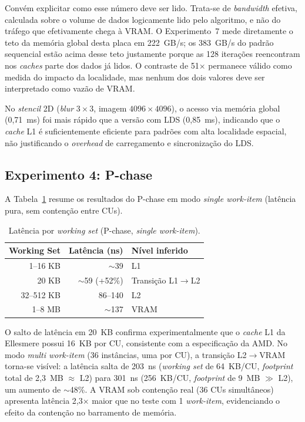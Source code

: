 Convém explicitar como esse número deve ser lido. Trata-se de \textit{bandwidth} efetiva, calculada sobre o volume de dados logicamente lido pelo algoritmo, e não do tráfego que efetivamente chega à VRAM. O Experimento~7 mede diretamente o teto da memória global desta placa em 222~GB/s; os 383~GB/s do padrão sequencial estão acima desse teto justamente porque as 128 iterações reencontram nos \textit{caches} parte dos dados já lidos. O contraste de 51$\times$ permanece válido como medida do impacto da localidade, mas nenhum dos dois valores deve ser interpretado como vazão de VRAM.

No \textit{stencil} 2D (\textit{blur} $3\times3$, imagem $4096\times4096$), o acesso via memória global (0,71~ms) foi mais rápido que a versão com LDS (0,85~ms), indicando que o \textit{cache} L1 é suficientemente eficiente para padrões com alta localidade espacial, não justificando o \textit{overhead} de carregamento e sincronização do LDS.


\subsection{Experimento 4: P-chase}

A Tabela~\ref{tab:pchase} resume os resultados do P-chase em modo \textit{single work-item} (latência pura, sem contenção entre CUs).

\begin{table}[ht]
\centering
\caption{Latência por \textit{working set} (P-chase, \textit{single work-item}).}
\label{tab:pchase}
\small
\begin{tabular}{@{}rrl@{}}
\toprule
\textbf{Working Set} & \textbf{Latência (ns)} & \textbf{Nível inferido} \\
\midrule
1--16 KB & $\sim$39 & L1 \\
20 KB & $\sim$59 (+52\%) & Transição L1$\to$L2 \\
32--512 KB & 86--140 & L2 \\
1--8 MB & $\sim$137 & VRAM \\
\bottomrule
\end{tabular}
\end{table}

O salto de latência em 20~KB confirma experimentalmente que o \textit{cache} L1 da Ellesmere possui 16~KB por CU, consistente com a especificação da AMD. No modo \textit{multi work-item} (36 instâncias, uma por CU), a transição L2$\to$VRAM torna-se visível: a latência salta de 203~ns (\textit{working set} de 64~KB/CU, \textit{footprint} total de 2,3~MB $\approx$ L2) para 301~ns (256~KB/CU, \textit{footprint} de 9~MB $\gg$ L2), um aumento de $\sim$48\%. A VRAM sob contenção real (36 CUs simultâneos) apresenta latência 2,3$\times$ maior que no teste com 1 \textit{work-item}, evidenciando o efeito da contenção no barramento de memória.


